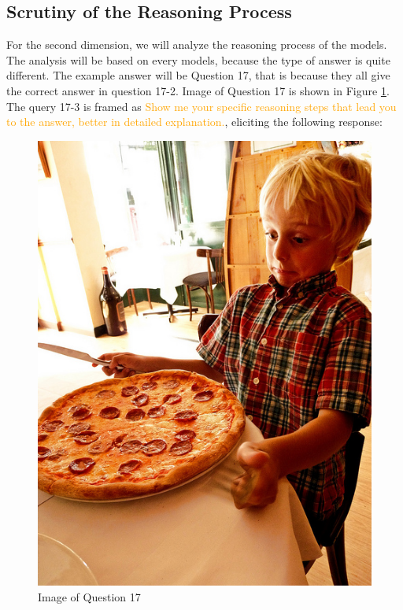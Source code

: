 \documentclass[journal,10pt]{IEEEtran}
\begin{document}
\subsection{Scrutiny of the Reasoning Process}

For the second dimension, we will analyze the reasoning process of the models. The analysis will be based on every models, because the type of answer is quite different. The example answer will be Question 17, that is because they all give the correct answer in question 17-2. Image of Question 17 is shown in Figure \ref{fig:reasoning-process}. The query 17-3 is framed as \textcolor{orange}{Show me your specific reasoning steps that lead you to the answer, better in detailed explanation.}, eliciting the following response:

\begin{figure}[h]
    \centering
    \includegraphics[width=0.6\linewidth]{../image set/easy/000000089367.jpg}
    \caption{Image of Question 17}
    \label{fig:reasoning-process}
\end{figure}
\end{document}
